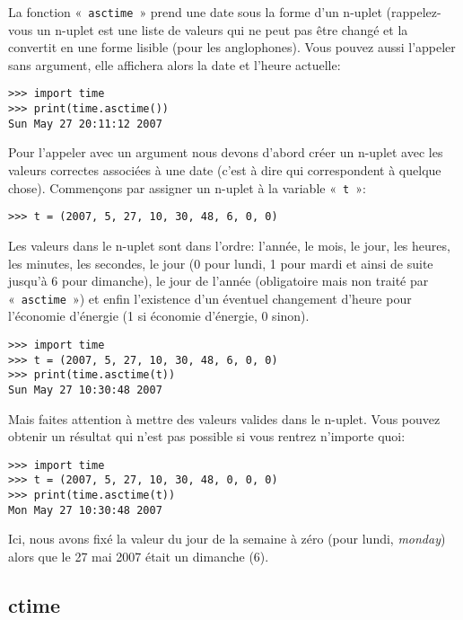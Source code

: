 La fonction «~\verb+asctime+~» prend une date sous la forme d'un n-uplet (rappelez-vous un n-uplet est une liste de valeurs qui ne peut pas être changé et la convertit en une forme lisible (pour les anglophones). Vous pouvez aussi l'appeler sans argument, elle affichera alors la date et l'heure actuelle:

\begin{Verbatim}[frame=single,rulecolor=\color{gray}]
>>> import time
>>> print(time.asctime())
Sun May 27 20:11:12 2007
\end{Verbatim}

Pour l'appeler avec un argument nous devons d'abord créer un n-uplet avec les valeurs correctes associées à une date (c'est à dire qui correspondent à quelque chose). Commençons par assigner un n-uplet à la variable «~\texttt{t}~»:

\begin{Verbatim}[frame=single,rulecolor=\color{gray}]
>>> t = (2007, 5, 27, 10, 30, 48, 6, 0, 0)
\end{Verbatim}

Les valeurs dans le n-uplet sont dans l'ordre: l'année, le mois, le jour, les heures, les minutes, les secondes, le jour (0 pour lundi, 1 pour mardi et ainsi de suite jusqu'à 6 pour dimanche), le jour de l'année (obligatoire mais non traité par «~\texttt{asctime}~») et enfin l'existence d'un éventuel changement d'heure pour l'économie d'énergie (1 si économie d'énergie, 0 sinon).

\begin{Verbatim}[frame=single,rulecolor=\color{gray}]
>>> import time
>>> t = (2007, 5, 27, 10, 30, 48, 6, 0, 0)
>>> print(time.asctime(t))
Sun May 27 10:30:48 2007
\end{Verbatim}

Mais faites attention à mettre des valeurs valides dans le n-uplet. Vous pouvez obtenir un résultat qui n'est pas possible si vous rentrez n'importe quoi:

\begin{Verbatim}[frame=single,rulecolor=\color{gray}]
>>> import time
>>> t = (2007, 5, 27, 10, 30, 48, 0, 0, 0)
>>> print(time.asctime(t))
Mon May 27 10:30:48 2007
\end{Verbatim}

Ici, nous avons fixé la valeur du jour de la semaine à zéro (pour lundi, \emph{monday}) alors que le 27 mai 2007 était un dimanche (6).

\subsection{ctime}

